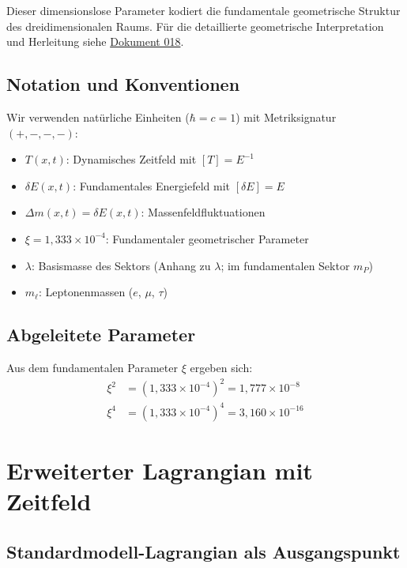 	Dieser dimensionslose Parameter kodiert die fundamentale geometrische Struktur des dreidimensionalen Raums. Für die detaillierte geometrische Interpretation und Herleitung siehe \href{https://github.com/jpascher/T0-Time-Mass-Duality/blob/main/2/pdf/018_T0_Anomale-g2-10_De.pdf}{Dokument 018}.
	
	\subsection{Notation und Konventionen}
	
	Wir verwenden natürliche Einheiten ($\hbar = c = 1$) mit Metriksignatur $(+,-,-,-)$:
	
	\begin{itemize}
		\item $T(x,t)$: Dynamisches Zeitfeld mit $[T] = E^{-1}$
		\item $\delta E(x,t)$: Fundamentales Energiefeld mit $[\delta E] = E$
		\item $\Delta m(x,t) = \delta E(x,t)$: Massenfeldfluktuationen
		\item $\xi = 1{,}333 \times 10^{-4}$: Fundamentaler geometrischer Parameter
		\item $\lambda$: Basismasse des Sektors (Anhang zu $\lambda$; im fundamentalen Sektor $m_P$)
		\item $m_\ell$: Leptonenmassen ($e$, $\mu$, $\tau$)
	\end{itemize}
	
	\subsection{Abgeleitete Parameter}
	
	Aus dem fundamentalen Parameter $\xi$ ergeben sich:
	\begin{align}
		\xi^2 &= \left(1{,}333 \times 10^{-4}\right)^2 = 1{,}777 \times 10^{-8} \label{eq:xi_squared} \\
		\xi^4 &= \left(1{,}333 \times 10^{-4}\right)^4 = 3{,}160 \times 10^{-16} \label{eq:xi_fourth}
	\end{align}
	
	\section{Erweiterter Lagrangian mit Zeitfeld}
	
	\subsection{Standardmodell-Lagrangian als Ausgangspunkt}
	
